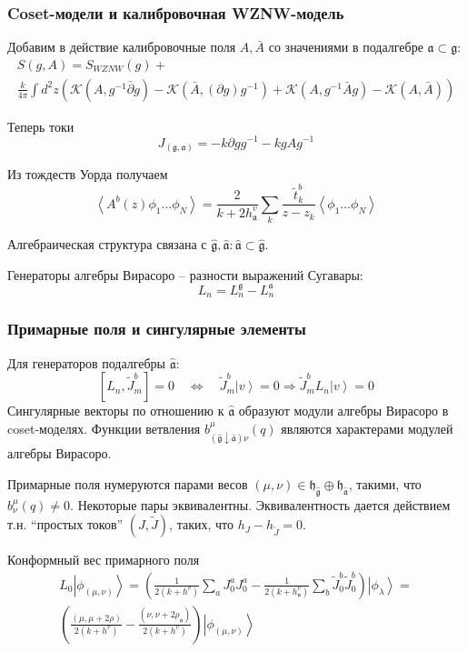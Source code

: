 \documentclass[pdftex]{beamer}
\newcommand{\gf}{\mathfrak{g}}
\newcommand{\gfh}{\hat{\mathfrak{g}}}
\newcommand{\af}{\mathfrak{a}}
\newcommand{\afh}{\hat{\mathfrak{a}}}
\newcommand{\hf}{\mathfrak{h}}
\theoremstyle{definition} \newtheorem{Def}{Definition}
\begin{document}
\begin{frame}
  \frametitle{Coset-модели и калибровочная WZNW-модель}

  Добавим в действие калибровочные поля $A, \bar{A}$ со значениями в подалгебре $\af\subset \gf$:
  \begin{multline*}
    S(g,A)=S_{WZNW}(g)+\\
    \frac{k}{4\pi}\int d^{2}z \left(\mathcal{K}(A, g^{-1}\bar \partial g)-\mathcal{K}(\bar A, (\partial g ) g^{-1})+\mathcal{K}(A,g^{-1}\bar A g)-\mathcal{K}(A,\bar A)\right)
  \end{multline*}

  Теперь токи
  \begin{equation*}
    J_{(\gf,\af)}=-k\partial g g^{-1} -k g A g^{-1}
  \end{equation*}

  Из тождеств Уорда получаем
  \begin{equation*}
    \left< A^{b}(z)\phi_{1}\dots \phi_{N}\right>=\frac{2}{k+2 h^{v}_{\af}}\sum_{k}\frac{\tilde{t}^{b}_{k}}{z-z_{k}}\left<\phi_{1}\dots \phi_{N}\right>
  \end{equation*}


  Алгебраическая структура связана с  $\gfh, \afh: \afh\subset\gfh$. 

  Генераторы алгебры Вирасоро -- разности выражений Сугавары:
  \begin{equation*}
    L_{n}=L_{n}^{\gf}-L_{n}^{\af}
  \end{equation*}
\end{frame}

\begin{frame}
  \frametitle{Примарные поля и сингулярные элементы}
  Для генераторов подалгебры $\afh$:
  \begin{equation*}
    \left[ L_{n}, \tilde{J}^{b}_{m}\right]=0 \quad\Longleftrightarrow\quad \tilde{J}^{b}_{m}\left| v \right>=0\Rightarrow \tilde{J}^{b}_{m}L_{n}\left| v \right>=0
  \end{equation*}
  Сингулярные векторы по отношению к $\afh$ образуют модули алгебры Вирасоро в coset-моделях. Функции ветвления $b^{\mu}_{(\gfh\downarrow\afh) \nu}(q)$ являются характерами модулей алгебры Вирасоро.

  Примарные поля нумеруются парами весов $(\mu,\nu)\in \hf_{\gfh}\oplus \hf_{\afh}$, такими, что  $b^{\mu}_{\nu}(q)\neq 0$. Некоторые пары эквивалентны. Эквивалентность дается действием т.н. ``простых токов'' $(J,\tilde{J})$, таких, что $h_{J}-h_{\tilde{J}}=0$. 

  Конформный вес примарного поля
  \begin{multline}
    L_0\left|\phi_{(\mu,\nu)}\right>=\left(\frac{1}{2(k+h^v)}\sum_aJ^a_0J^a_0-\frac{1}{2(k+h_{\af}^v)}\sum_b \tilde{J}^b_0 \tilde{J}^b_0 \right)
    \left|\phi_{\lambda}\right>=\\
    \left(\frac{(\mu,\mu+2\rho)}{2(k+h^v)}-\frac{(\nu,\nu+2\rho_{\af})}{2(k+h^v)}\right)\left|\phi_{(\mu,\nu)}\right>
  \end{multline}

\end{frame}
\end{document}
